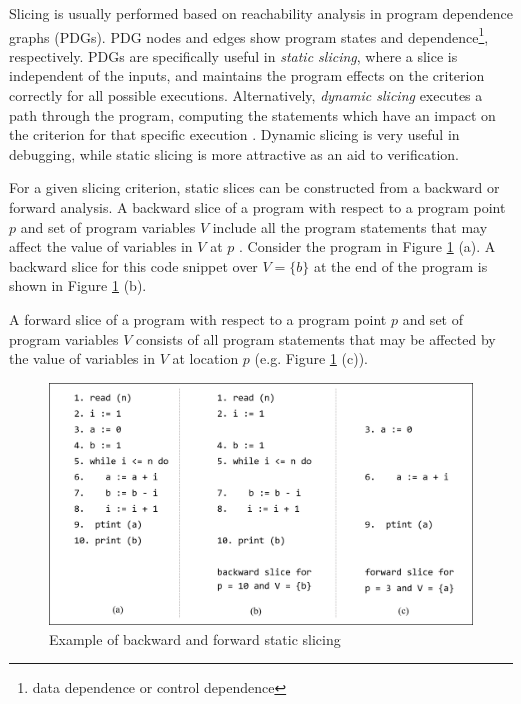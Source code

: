 Slicing is usually performed based on reachability analysis in program
dependence graphs (PDGs). PDG nodes and edges show program states and dependence\footnote{data dependence or control dependence}, respectively. PDGs are specifically useful in \emph{static slicing}, where
a slice is independent of the inputs,
 and maintains the program effects on the criterion
correctly for all possible executions. Alternatively,
\emph{dynamic slicing} executes a path through the program, computing the statements which have an impact on the criterion for that
specific execution \cite{Androutsopoulos}. Dynamic slicing is very useful in debugging, while static slicing is more attractive as an aid to verification.

For a given slicing criterion, static slices can be constructed from a backward or forward analysis.
A backward slice of a program with respect to a
program point $p$ and  set of program variables $V$ include all the program statements that may affect the value of variables in
$V$ at $p$ \cite{slcnote}. Consider the program in Figure \ref{fig:exslic} (a).
A backward slice for this code snippet over $V = \{b\}$ at the end of the program is shown in  Figure \ref{fig:exslic} (b).

A forward slice of a program with respect to a
program point $p$ and set of program variables $V$
consists of all program statements that may be affected by the value of
variables in $V$ at location $p$ \cite{slcnote} (e.g.  Figure \ref{fig:exslic} (c)).


\begin{figure}
  \centering
  \includegraphics[width=\textwidth]{figs/exslic.png}
  \caption{Example of backward and forward static slicing}
 \label{fig:exslic}
\end{figure}


